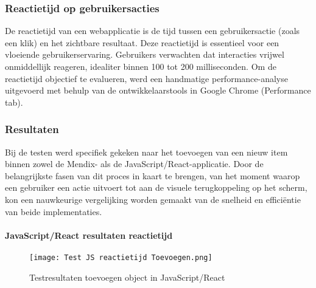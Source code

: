 \subsubsection{Reactietijd op gebruikersacties}
De reactietijd van een webapplicatie is de tijd tussen een gebruikersactie (zoals een klik) en het zichtbare resultaat. Deze reactietijd is essentieel voor een vloeiende gebruikerservaring. Gebruikers verwachten dat interacties vrijwel onmiddellijk reageren, idealiter binnen 100 tot 200 milliseconden. Om de reactietijd objectief te evalueren, werd een handmatige performance-analyse uitgevoerd met behulp van de ontwikkelaarstools in Google Chrome (Performance tab). 

\subsubsection{Resultaten}
Bij de testen werd specifiek gekeken naar het toevoegen van een nieuw item binnen zowel de Mendix- als de JavaScript/React-applicatie. Door de belangrijkste fasen van dit proces in kaart te brengen, van het moment waarop een gebruiker een actie uitvoert tot aan de visuele terugkoppeling op het scherm, kon een nauwkeurige vergelijking worden gemaakt van de snelheid en efficiëntie van beide implementaties.

\paragraph{JavaScript/React resultaten reactietijd}

\begin{figure}[H]
    \centering
    \captionsetup{justification=centering}
    \texttt{[image: Test JS reactietijd Toevoegen.png]}
    \caption[Testresultaten toevoegen object in JavaScript/React]{\label{fig:reactietijd-JavaScript} Testresultaten toevoegen object in JavaScript/React }
\end{figure}



